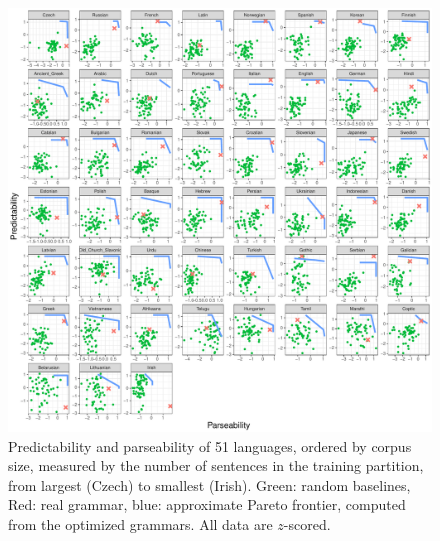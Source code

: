 \documentclass[10pt,twoside,lineno]{article}
\begin{document}




\begin{figure}
\centering
\includegraphics[width=\textwidth]{../results/plane/pareto-plane-perLanguage.pdf}
	\caption[Predictability and Parseability]{Predictability and parseability of 51 languages, ordered by corpus size, measured by the number of sentences in the training partition, from largest (Czech) to smallest (Irish). Green: random baselines, Red: real grammar, blue: approximate Pareto frontier, computed from the optimized grammars. All data are $z$-scored.}\label{fig:pareto-per-lang}
\end{figure}
\end{document}
